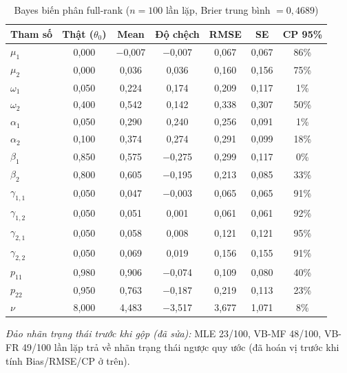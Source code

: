\documentclass[11pt,a4paper]{article}
\begin{document}
\begin{table}[H]\centering\footnotesize
\caption{Bayes biến phân full-rank ($n=100$ lần lặp, Brier trung bình $=0,4689$)}
\begin{tabularx}{\textwidth}{l C C C C C C}
\toprule
\textbf{Tham số} & \textbf{Thật ($\theta_0$)} & \textbf{Mean} & \textbf{Độ chệch} & \textbf{RMSE} & \textbf{SE} & \textbf{CP 95\%} \\
\midrule
$\mu_1$ & 0,000 & $-$0,007 & $-$0,007 & 0,067 & 0,067 & 86\% \\
$\mu_2$ & 0,000 & 0,036 & 0,036 & 0,160 & 0,156 & 75\% \\
$\omega_1$ & 0,050 & 0,224 & 0,174 & 0,209 & 0,117 & 1\% \\
$\omega_2$ & 0,400 & 0,542 & 0,142 & 0,338 & 0,307 & 50\% \\
$\alpha_1$ & 0,050 & 0,290 & 0,240 & 0,256 & 0,091 & 1\% \\
$\alpha_2$ & 0,100 & 0,374 & 0,274 & 0,291 & 0,099 & 18\% \\
$\beta_1$ & 0,850 & 0,575 & $-$0,275 & 0,299 & 0,117 & 0\% \\
$\beta_2$ & 0,800 & 0,605 & $-$0,195 & 0,213 & 0,085 & 33\% \\
$\gamma_{1,1}$ & 0,050 & 0,047 & $-$0,003 & 0,065 & 0,065 & 91\% \\
$\gamma_{1,2}$ & 0,050 & 0,051 & 0,001 & 0,061 & 0,061 & 92\% \\
$\gamma_{2,1}$ & 0,050 & 0,058 & 0,008 & 0,121 & 0,121 & 95\% \\
$\gamma_{2,2}$ & 0,050 & 0,069 & 0,019 & 0,156 & 0,155 & 91\% \\
$p_{11}$ & 0,980 & 0,906 & $-$0,074 & 0,109 & 0,080 & 40\% \\
$p_{22}$ & 0,950 & 0,763 & $-$0,187 & 0,219 & 0,113 & 23\% \\
$\nu$ & 8,000 & 4,483 & $-$3,517 & 3,677 & 1,071 & 8\% \\
\bottomrule
\end{tabularx}
\end{table}

\emph{Đảo nhãn trạng thái trước khi gộp (đã sửa):} MLE 23/100, VB-MF 48/100, VB-FR 49/100 lần lặp trả về nhãn trạng thái ngược quy ước (đã hoán vị trước khi tính Bias/RMSE/CP ở trên).
\bigskip
\end{document}
